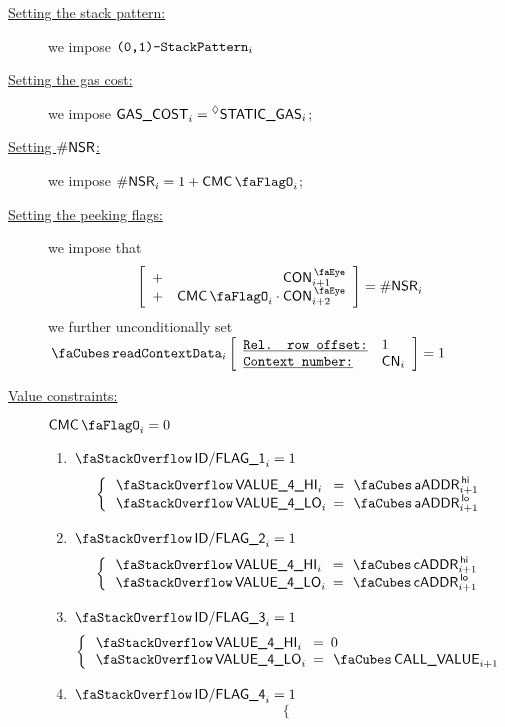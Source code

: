 \begin{description}
	\item[\underline{Setting the stack pattern:}]
		we impose $\texttt{(0,1)-}\texttt{StackPattern}_{i}$
	\item[\underline{Setting the gas cost:}]
		we impose $\textsf{GAS}\textsf{\_COST}_{i} = \prescript{\lozenge}{}{\textsf{STATIC\_GAS}}_{i}$;
	\item[\underline{Setting $\textsf{\#NSR}$:}]
		we impose $\nonStackRows_{i} = 1 + \cmc_{i}$;
	\item[\underline{Setting the peeking flags:}]
		we impose that
		\[
			\left[ \begin{array}{cr}
				+ & \peekContext_{i + 1} \\
				+ & \cmc_{i} \cdot \peekContext_{i + 2} \\
			\end{array} \right]
			= \nonStackRows_{i}
		\]
		we further unconditionally set $\readContextData {i}{1}{\cn_{i}} = 1$
	\item[\underline{Value constraints:}]
		\If $\cmc_{i} = 0$ \Then
		\begin{enumerate}
			\item \If $\decFlag{1}_{i} = 1$ \Then
				\[
					\left\{ \begin{array}{lcl}
						\stackItemValHi{4}_{i} & \!\!\! = \!\!\! & \cnAccountAddress\high_{i + 1} \\
						\stackItemValLo{4}_{i} & \!\!\! = \!\!\! & \cnAccountAddress\low_{i + 1} \\
					\end{array} \right.
				\]
			\item \If $\decFlag{2}_{i} = 1$ \Then
				\[
					\left\{ \begin{array}{lcl}
						\stackItemValHi{4}_{i} & \!\!\! = \!\!\! & \cnCallerAddress\high_{i + 1} \\
						\stackItemValLo{4}_{i} & \!\!\! = \!\!\! & \cnCallerAddress\low_{i + 1} \\
					\end{array} \right.
				\]
			\item \If $\decFlag{3}_{i} = 1$ \Then
				\[
					\left\{ \begin{array}{lcl}
						\stackItemValHi{4}_{i} & \!\!\! = \!\!\! & 0 \\
						\stackItemValLo{4}_{i} & \!\!\! = \!\!\! & \cnCallValue_{i + 1} \\
					\end{array} \right.
				\]
			\item \If $\decFlag{4}_{i} = 1$ \Then
				\[
					\left\{ \begin{array}{lcl}

\end{array}\]
\end{enumerate}
\end{description}
